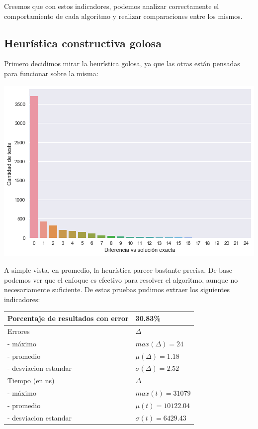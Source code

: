 Creemos que con estos indicadores, podemos analizar correctamente el comportamiento de cada algoritmo y realizar comparaciones entre los mismos.

\subsection{Heurística constructiva golosa}

Primero decidimos mirar la heurística golosa, ya que las otras están pensadas para funcionar sobre la misma:

\begin{center}
    \includegraphics[scale=0.6]{img/accuracy-greedy.png}
\end{center}

A simple vista, en promedio, la heurística parece bastante precisa. De base podemos ver que el enfoque es efectivo para resolver el algoritmo, aunque no necesariamente suficiente. De estas pruebas pudimos extraer los siguientes indicadores:

\begin{center}
    \begin{tabular}{ | l l |}
        \hline
        Porcentaje de resultados con error & 30.83\% \\ \hline
        Errores & $\Delta$ \\
        - máximo & $max(\Delta) = 24$ \\
        - promedio & $\mu(\Delta) = 1.18$ \\
        - desviacion estandar & $\sigma(\Delta) = 2.52$ \\ \hline
        Tiempo (en ns) & $\Delta$ \\
        - máximo & $max(t) = 31079 $ \\
        - promedio & $\mu(t) = 10122.04$ \\
        - desviacion estandar & $\sigma(t) = 6429.43$ \\
        \hline
    \end{tabular}
\end{center}

